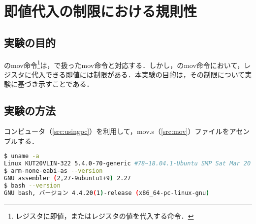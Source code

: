 \chapter{即値代入の制限における規則性}
\section{実験の目的}
\aasm の{\ttfamily mov}命令\footnote{レジスタに即値，またはレジスタの値を代入する命令．}は，\iasm で扱った{\ttfamily mov}命令と対応する．しかし，\aasm の{\ttfamily mov}命令において，レジスタに代入できる即値には制限がある．本実験の目的は，その制限について実験に基づき示すことである．\par
\section{実験の方法}
コンピュータ（\ref{src:usingpc}）を利用して，{\ttfamily mov.s}（\ref{src:mov}）ファイルをアセンブルする．
\begin{lstlisting}[caption={利用コンピュータ及び実行環境},label={src:usingpc},language={Bash},numbers={none},breakindent={0pt}]
$ uname -a
Linux KUT20VLIN-322 5.4.0-70-generic #78~18.04.1-Ubuntu SMP Sat Mar 20 14:10:07 UTC 2021 x86_64 x86_64 x86_64 GNU/Linux
$ arm-none-eabi-as --version
GNU assembler (2,27-9ubuntu1+9) 2.27
$ bash --version
GNU bash, バージョン 4.4.20(1)-release (x86_64-pc-linux-gnu)
\end{lstlisting}
